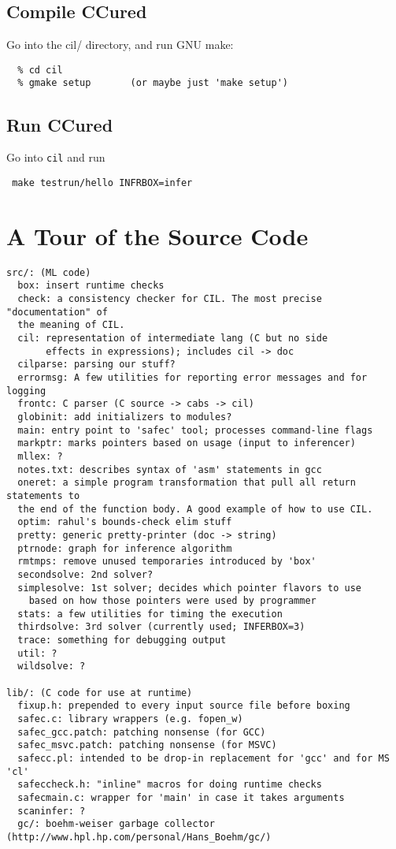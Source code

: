 \documentclass{book}
\def\t#1{{\tt #1}}
\begin{document}
\section{Compile CCured}

Go into the cil/ directory, and run GNU make:

\begin{verbatim}
  % cd cil
  % gmake setup       (or maybe just 'make setup')
\end{verbatim}


\section{Run CCured}

Go into \t{cil} and run
\begin{verbatim}
 make testrun/hello INFRBOX=infer
\end{verbatim}


\appendix



\chapter{A Tour of the Source Code}
\begin{verbatim}
src/: (ML code)
  box: insert runtime checks
  check: a consistency checker for CIL. The most precise "documentation" of
  the meaning of CIL.
  cil: representation of intermediate lang (C but no side
       effects in expressions); includes cil -> doc
  cilparse: parsing our stuff?
  errormsg: A few utilities for reporting error messages and for logging
  frontc: C parser (C source -> cabs -> cil)
  globinit: add initializers to modules?
  main: entry point to 'safec' tool; processes command-line flags
  markptr: marks pointers based on usage (input to inferencer)
  mllex: ?
  notes.txt: describes syntax of 'asm' statements in gcc
  oneret: a simple program transformation that pull all return statements to
  the end of the function body. A good example of how to use CIL.
  optim: rahul's bounds-check elim stuff
  pretty: generic pretty-printer (doc -> string)
  ptrnode: graph for inference algorithm
  rmtmps: remove unused temporaries introduced by 'box'
  secondsolve: 2nd solver?
  simplesolve: 1st solver; decides which pointer flavors to use
    based on how those pointers were used by programmer
  stats: a few utilities for timing the execution
  thirdsolve: 3rd solver (currently used; INFERBOX=3)
  trace: something for debugging output
  util: ?
  wildsolve: ?

lib/: (C code for use at runtime)
  fixup.h: prepended to every input source file before boxing
  safec.c: library wrappers (e.g. fopen_w)
  safec_gcc.patch: patching nonsense (for GCC)
  safec_msvc.patch: patching nonsense (for MSVC)
  safecc.pl: intended to be drop-in replacement for 'gcc' and for MS 'cl'
  safeccheck.h: "inline" macros for doing runtime checks
  safecmain.c: wrapper for 'main' in case it takes arguments
  scaninfer: ?
  gc/: boehm-weiser garbage collector (http://www.hpl.hp.com/personal/Hans_Boehm/gc/)
\end{verbatim}
\end{document}
